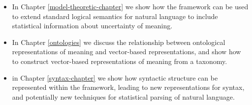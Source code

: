 \begin{itemize}
\begin{itemize}
\item In Chapter \ref{model-theoretic-chapter} we show how the framework can be used to extend standard logical semantics for natural language to include statistical information about uncertainty of meaning.
\item In Chapter \ref{ontologies} we discuss the relationship between ontological representations of meaning and vector-based representations, and show how to construct vector-based representations of meaning from a taxonomy.
\item in Chapter \ref{syntax-chapter} we show how syntactic structure can be represented within the framework, leading to new representations for syntax, and potentially new techniques for statistical parsing of natural language.
\end{itemize}


\end{itemize}

